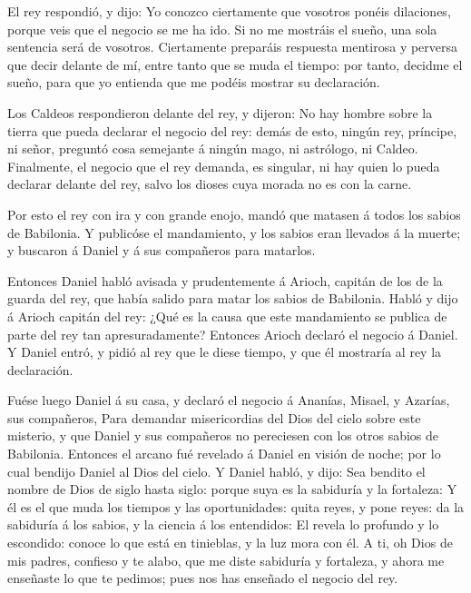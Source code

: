  El rey respondió, y dijo: Yo conozco ciertamente que
vosotros ponéis dilaciones, porque veis que el negocio se me ha ido.
 Si no me mostráis el sueño, una sola sentencia será de
vosotros. Ciertamente preparáis respuesta mentirosa y perversa que decir
delante de mí, entre tanto que se muda el tiempo: por tanto, decidme el
sueño, para que yo entienda que me podéis mostrar su declaración.

 Los Caldeos respondieron delante del rey, y dijeron: No
hay hombre sobre la tierra que pueda declarar el negocio del rey: demás
de esto, ningún rey, príncipe, ni señor, preguntó cosa semejante á
ningún mago, ni astrólogo, ni Caldeo.  Finalmente, el
negocio que el rey demanda, es singular, ni hay quien lo pueda declarar
delante del rey, salvo los dioses cuya morada no es con la carne.

 Por esto el rey con ira y con grande enojo, mandó que
matasen á todos los sabios de Babilonia.  Y publicóse el
mandamiento, y los sabios eran llevados á la muerte; y buscaron á Daniel
y á sus compañeros para matarlos.

 Entonces Daniel habló avisada y prudentemente á Arioch,
capitán de los de la guarda del rey, que había salido para matar los
sabios de Babilonia.  Habló y dijo á Arioch capitán del
rey: ¿Qué es la causa que este mandamiento se publica de parte del rey
tan apresuradamente? Entonces Arioch declaró el negocio á Daniel.
 Y Daniel entró, y pidió al rey que le diese tiempo, y que
él mostraría al rey la declaración.

 Fuése luego Daniel á su casa, y declaró el negocio á
Ananías, Misael, y Azarías, sus compañeros,  Para demandar
misericordias del Dios del cielo sobre este misterio, y que Daniel y sus
compañeros no pereciesen con los otros sabios de Babilonia.
 Entonces el arcano fué revelado á Daniel en visión de
noche; por lo cual bendijo Daniel al Dios del cielo.  Y
Daniel habló, y dijo: Sea bendito el nombre de Dios de siglo hasta
siglo: porque suya es la sabiduría y la fortaleza:  Y él es
el que muda los tiempos y las oportunidades: quita reyes, y pone reyes:
da la sabiduría á los sabios, y la ciencia á los entendidos:
 El revela lo profundo y lo escondido: conoce lo que está
en tinieblas, y la luz mora con él.  A ti, oh Dios de mis
padres, confieso y te alabo, que me diste sabiduría y fortaleza, y ahora
me enseñaste lo que te pedimos; pues nos has enseñado el negocio del
rey.

